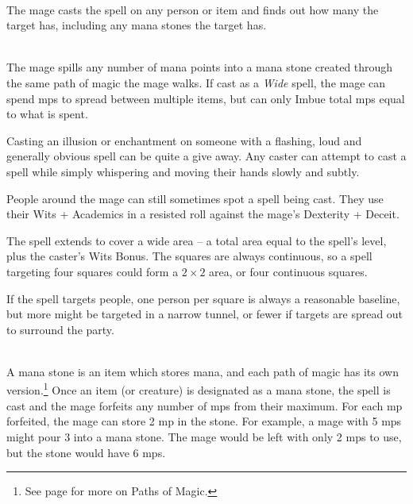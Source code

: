 \begin{multicols}{2}
\\
The mage casts the spell on any person or item and finds out how many  the target has, including any mana stones the target has.

\spelllevel

\\
The mage spills any number of mana points into a mana stone created through the same path of magic the mage walks.
If cast as a \textit{Wide} spell, the mage can spend \glspl{mp} to spread between multiple items, but can only Imbue total \glspl{mp} equal to what is spent.


Casting an illusion or enchantment on someone with a flashing, loud and generally obvious spell can be quite a give away.
Any caster can attempt to cast a spell while simply whispering and moving their hands slowly and subtly.

People around the mage can still sometimes spot a spell being cast. They use their Wits + Academics in a resisted roll against the mage's Dexterity + Deceit.

The spell extends to cover a wide area -- a total area equal to the spell's level, plus the caster's Wits Bonus.
The squares are always continuous, so a spell targeting four squares could form a $2\times 2$ area, or four continuous squares.

If the spell targets people, one person per square is always a reasonable baseline, but more might be targeted in a narrow tunnel, or fewer if targets are spread out to surround the party.

\spelllevel

\\
A mana stone is an item which stores mana, and each path of magic has its own version.\footnote{See page \pageref{magic_paths} for more on Paths of Magic.}
Once an item (or creature) is designated as a mana stone, the spell is cast and the mage forfeits any number of \glspl{mp} from their maximum.
For each \gls{mp} forfeited, the mage can store 2 \gls{mp} in the stone.
For example, a mage with 5 \glspl{mp} might pour 3 into a mana stone.
The mage would be left with only 2 \glspl{mp} to use, but the stone would have 6 \glspl{mp}.


\end{multicols}

